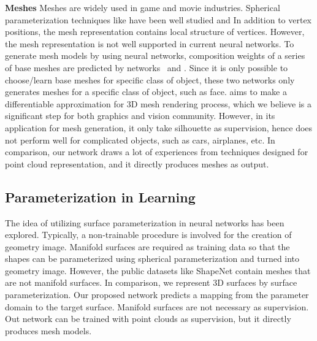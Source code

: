 %

\noindent\textbf{Meshes}
Meshes are widely used in game and movie industries. Spherical parameterization techniques like \cite{HuAHSP2018} have been well studied and 
In addition to vertex positions, the mesh representation contains local structure of vertices. 
However, the mesh representation is not well supported in current neural networks.
% 
To generate mesh models by using neural networks, composition weights of a series of base meshes are predicted by networks~\cite{img2mesh} and \cite{endface}. %
Since it is only possible to choose/learn base meshes for specific class of object, these two networks only generates meshes for a specific class of object, such as face.
%
\cite{3Drender} aims to make a differentiable approximation for 3D mesh rendering process, which we believe is a significant step for both graphics and vision community. However, in its application for mesh generation, it only take silhouette as supervision, hence does not perform well for complicated objects, such as cars, airplanes, etc.
%
In comparison, our network draws a lot of experiences from techniques designed for point cloud representation, and it directly produces meshes as output.

\subsection{Parameterization in Learning}
The idea of utilizing surface parameterization in neural networks has been explored\cite{surfnet,geoimg}. 
Typically, a non-trainable procedure is involved for the creation of geometry image. 
Manifold surfaces are required as training data so that the shapes can be parameterized using spherical parameterization and turned into geometry image. However, the public datasets like ShapeNet\cite{shapenetdata} contain meshes that are not manifold surfaces. 
In comparison, we represent 3D surfaces by surface parameterization. 
Our proposed network predicts a mapping from the parameter domain to the target surface. Manifold surfaces are not necessary as supervision.
Out network can be trained with point clouds as supervision, but it directly produces mesh models.

